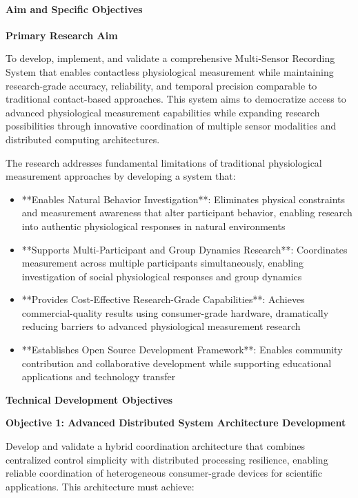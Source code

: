 \documentclass[12pt,a4paper]{report}
\begin{document}
\paragraph{Aim and Specific Objectives}

\textbf{Primary Research Aim}

To develop, implement, and validate a comprehensive Multi-Sensor Recording System that enables contactless physiological
measurement while maintaining research-grade accuracy, reliability, and temporal precision comparable to traditional
contact-based approaches. This system aims to democratize access to advanced physiological measurement capabilities
while expanding research possibilities through innovative coordination of multiple sensor modalities and distributed
computing architectures.

The research addresses fundamental limitations of traditional physiological measurement approaches by developing a
system that:

\begin{itemize}
\item **Enables Natural Behavior Investigation**: Eliminates physical constraints and measurement awareness that alter
  participant behavior, enabling research into authentic physiological responses in natural environments
\item **Supports Multi-Participant and Group Dynamics Research**: Coordinates measurement across multiple participants
  simultaneously, enabling investigation of social physiological responses and group dynamics
\item **Provides Cost-Effective Research-Grade Capabilities**: Achieves commercial-quality results using consumer-grade
  hardware, dramatically reducing barriers to advanced physiological measurement research
\item **Establishes Open Source Development Framework**: Enables community contribution and collaborative development while
  supporting educational applications and technology transfer

\end{itemize}
\textbf{Technical Development Objectives}

\textbf{Objective 1: Advanced Distributed System Architecture Development}

Develop and validate a hybrid coordination architecture that combines centralized control simplicity with distributed
processing resilience, enabling reliable coordination of heterogeneous consumer-grade devices for scientific
applications. This architecture must achieve:
\end{document}
